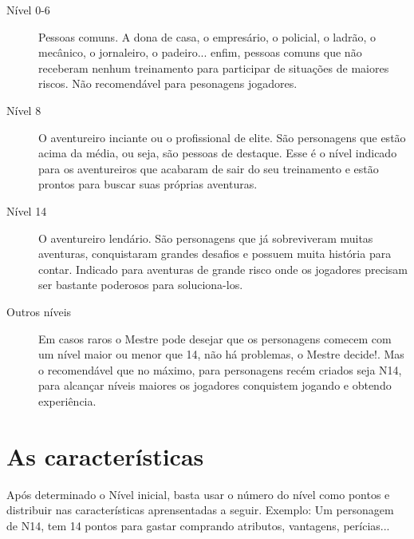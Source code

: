 \begin{description}

\item[Nível 0-6] Pessoas comuns. A dona de casa, o empresário, o policial, o ladrão, o mecânico, o jornaleiro, o padeiro... enfim, pessoas comuns que não receberam nenhum treinamento para participar de situações de maiores riscos. Não recomendável para pesonagens jogadores.

\item[Nível 8] O aventureiro inciante ou o profissional de elite. São personagens que estão acima da média, ou seja, são pessoas de destaque. Esse é o nível indicado para os aventureiros que acabaram de sair do seu treinamento e estão prontos para buscar suas próprias aventuras.

\item[Nível 14] O aventureiro lendário. São personagens que já sobreviveram muitas aventuras, conquistaram grandes desafios e possuem muita história para contar. Indicado para aventuras de grande risco onde os jogadores precisam ser bastante poderosos para soluciona-los.

\item[Outros níveis] Em casos raros o Mestre pode desejar que os personagens comecem com um nível maior ou menor que 14, não há problemas, o Mestre decide!. Mas o recomendável que no máximo, para personagens recém criados seja N14, para alcançar níveis maiores os jogadores conquistem jogando e obtendo experiência.

\end{description}

\section{As características}

Após determinado o Nível inicial, basta usar o número do nível como pontos e distribuir nas características aprensentadas a seguir. Exemplo: Um personagem de N14, tem 14 pontos para gastar comprando atributos, vantagens, perícias...

